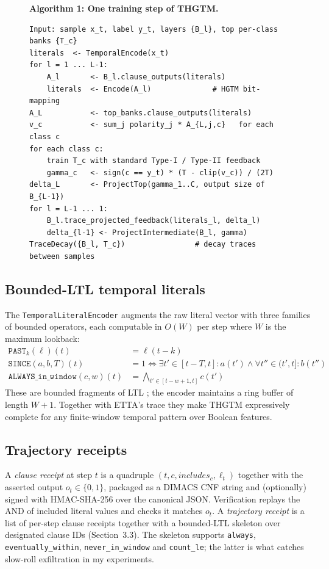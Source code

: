 \documentclass[11pt]{article}
\begin{document}
\begin{figure}[t]
\noindent\hrulefill\par
\textbf{Algorithm 1: One training step of THGTM.}\\[2pt]
\noindent\hrulefill
\begin{verbatim}
Input: sample x_t, label y_t, layers {B_l}, top per-class banks {T_c}
literals  <- TemporalEncode(x_t)
for l = 1 ... L-1:
    A_l       <- B_l.clause_outputs(literals)
    literals  <- Encode(A_l)              # HGTM bit-mapping
A_L           <- top_banks.clause_outputs(literals)
v_c           <- sum_j polarity_j * A_{L,j,c}   for each class c
for each class c:
    train T_c with standard Type-I / Type-II feedback
    gamma_c   <- sign(c == y_t) * (T - clip(v_c)) / (2T)
delta_L       <- ProjectTop(gamma_1..C, output size of B_{L-1})
for l = L-1 ... 1:
    B_l.trace_projected_feedback(literals_l, delta_l)
    delta_{l-1} <- ProjectIntermediate(B_l, gamma)
TraceDecay({B_l, T_c})                # decay traces between samples
\end{verbatim}
\noindent\hrulefill
\label{alg:thgtm-train}
\end{figure}

\subsection{Bounded-LTL temporal literals}

The \texttt{TemporalLiteralEncoder} augments the raw literal vector with three families of bounded operators, each computable in $O(W)$ per step where $W$ is the maximum lookback:
\begin{align}
\texttt{PAST}_k(\ell)(t) &= \ell(t - k) \\
\texttt{SINCE}(a, b, T)(t) &= 1 \iff \exists t' \in [t-T, t]: a(t') \land \forall t'' \in (t', t]: b(t'') \\
\texttt{ALWAYS\_in\_window}(c, w)(t) &= \bigwedge_{t' \in [t-w+1, t]} c(t')
\end{align}
These are bounded fragments of LTL \citep{bauer2011runtime}; the encoder maintains a ring buffer of length $W+1$.  Together with ETTA's trace they make THGTM expressively complete for any finite-window temporal pattern over Boolean features.

\subsection{Trajectory receipts}

A \emph{clause receipt} at step $t$ is a quadruple $(t, c, \mathit{includes}_c, \ell_t)$ together with the asserted output $o_t \in \{0, 1\}$, packaged as a DIMACS CNF string and (optionally) signed with HMAC-SHA-256 over the canonical JSON.  Verification replays the AND of included literal values and checks it matches $o_t$.  A \emph{trajectory receipt} is a list of per-step clause receipts together with a bounded-LTL skeleton over designated clause IDs (Section~3.3).  The skeleton supports \texttt{always}, \texttt{eventually\_within}, \texttt{never\_in\_window} and \texttt{count\_le}; the latter is what catches slow-roll exfiltration in my experiments.
\end{document}
